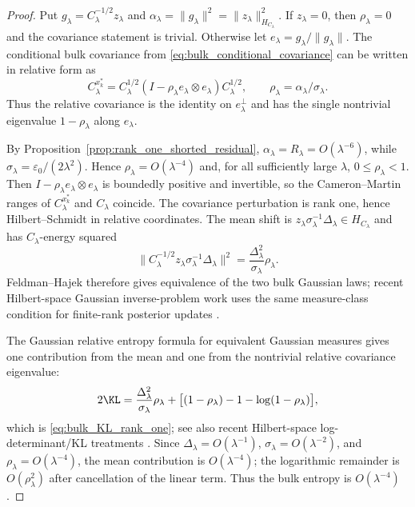 \begin{proof}
Put $g_\lambda=C_\lambda^{-1/2}z_\lambda$ and
$\alpha_\lambda=\|g_\lambda\|^2=\|z_\lambda\|_{H_{C_\lambda}}^2$.  If
$z_\lambda=0$, then $\rho_\lambda=0$ and the covariance statement is trivial.
Otherwise let $e_\lambda=g_\lambda/\|g_\lambda\|$.  The conditional bulk
covariance from \eqref{eq:bulk_conditional_covariance} can be written in
relative form as
\begin{equation}
  C_\lambda^{x_k^*}
  =C_\lambda^{1/2}
    (I-\rho_\lambda e_\lambda\otimes e_\lambda)
    C_\lambda^{1/2},
  \qquad
  \rho_\lambda=\alpha_\lambda/\sigma_\lambda.
  \label{eq:relative_rank_one_covariance}
\end{equation}
Thus the relative covariance is the identity on
$e_\lambda^\perp$ and has the single nontrivial eigenvalue
$1-\rho_\lambda$ along $e_\lambda$.

By Proposition~\ref{prop:rank_one_shorted_residual},
$\alpha_\lambda=R_\lambda=O(\lambda^{-6})$, while
$\sigma_\lambda=\varepsilon_0/(2\lambda^2)$.  Hence
$\rho_\lambda=O(\lambda^{-4})$ and, for all sufficiently large $\lambda$,
$0\le\rho_\lambda<1$.  Then
$I-\rho_\lambda e_\lambda\otimes e_\lambda$ is boundedly positive and invertible,
so the Cameron--Martin ranges of $C_\lambda^{x_k^*}$ and $C_\lambda$ coincide.
The covariance perturbation is rank one, hence Hilbert--Schmidt in relative
coordinates.  The mean shift is
$z_\lambda\sigma_\lambda^{-1}\Delta_\lambda\in H_{C_\lambda}$ and has
$C_\lambda$-energy squared
\[
  \bigl\|C_\lambda^{-1/2}z_\lambda\sigma_\lambda^{-1}\Delta_\lambda\bigr\|^2
  =\frac{\Delta_\lambda^2}{\sigma_\lambda}\rho_\lambda.
\]
Feldman--Hajek therefore gives equivalence of the two bulk Gaussian laws; recent Hilbert-space Gaussian inverse-problem work uses the same measure-class condition for finite-rank posterior updates \cite{carerelie2024covariance,carerelie2025mean}.

The Gaussian relative entropy formula for equivalent Gaussian measures gives
one contribution from the mean and one from the nontrivial relative covariance
eigenvalue:
\[
  2\KL
  =
  \frac{\Delta_\lambda^2}{\sigma_\lambda}\rho_\lambda
  +\bigl[(1-\rho_\lambda)-1-\log(1-\rho_\lambda)\bigr],
\]
which is \eqref{eq:bulk_KL_rank_one}; see also recent Hilbert-space log-determinant/KL treatments \cite{quang2022kl,carerelie2024covariance}.  Since
$\Delta_\lambda=O(\lambda^{-1})$, $\sigma_\lambda=O(\lambda^{-2})$, and
$\rho_\lambda=O(\lambda^{-4})$, the mean contribution is $O(\lambda^{-4})$;
the logarithmic remainder is $O(\rho_\lambda^2)$ after cancellation of the
linear term.  Thus the bulk entropy is $O(\lambda^{-4})$.
\end{proof}

